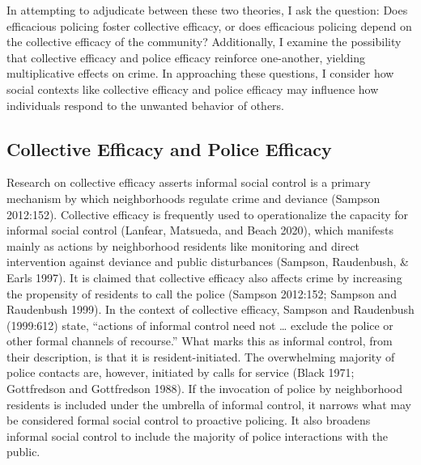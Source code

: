 \documentclass [11pt, proquest] {uwthesis}[2015/03/03]
\begin{document}
In attempting to adjudicate between these two theories, I ask the question: Does efficacious policing foster collective efficacy, or does efficacious policing depend on the collective efficacy of the community? Additionally, I examine the possibility that collective efficacy and police efficacy reinforce one-another, yielding multiplicative effects on crime. In approaching these questions, I consider how social contexts like collective efficacy and police efficacy may influence how individuals respond to the unwanted behavior of others.

\hypertarget{collective-efficacy-and-police-efficacy}{%
\subsection{Collective Efficacy and Police Efficacy}\label{collective-efficacy-and-police-efficacy}}

Research on collective efficacy asserts informal social control is a primary mechanism by which neighborhoods regulate crime and deviance (Sampson 2012:152). Collective efficacy is frequently used to operationalize the capacity for informal social control (Lanfear, Matsueda, and Beach 2020), which manifests mainly as actions by neighborhood residents like monitoring and direct intervention against deviance and public disturbances (Sampson, Raudenbush, \& Earls 1997). It is claimed that collective efficacy also affects crime by increasing the propensity of residents to call the police (Sampson 2012:152; Sampson and Raudenbush 1999). In the context of collective efficacy, Sampson and Raudenbush (1999:612) state, ``actions of informal control need not \ldots{} exclude the police or other formal channels of recourse.'' What marks this as informal control, from their description, is that it is resident-initiated. The overwhelming majority of police contacts are, however, initiated by calls for service (Black 1971; Gottfredson and Gottfredson 1988). If the invocation of police by neighborhood residents is included under the umbrella of informal control, it narrows what may be considered formal social control to proactive policing. It also broadens informal social control to include the majority of police interactions with the public.
\end{document}
